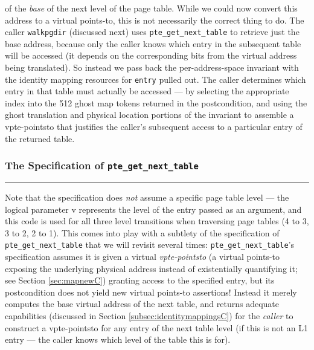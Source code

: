 of the \emph{base} of the next level of the page table.
While we could now convert this address to a virtual points-to, this is not necessarily the correct thing to do.
The caller \lstinline|walkpgdir| (discussed next) uses \lstinline|pte_get_next_table| to retrieve just the base address,
because only the caller knows which entry in the subsequent table will be accessed (it depends on the corresponding bits from the virtual
address being translated). So instead we pass back the per-address-space invariant with the identity mapping resources for \lstinline|entry|
pulled out. The caller determines which entry in that table must actually
be accessed --- by selecting the appropriate index into the 512 ghost map tokens returned in the postcondition,
and using the ghost translation and physical location portions of the invariant to assemble a vpte-pointsto
that justifies the caller's subsequent access to a particular entry of the returned table.

\subsubsection{The Specification of \lstinline|pte_get_next_table|}
\hrule

Note that the specification does \emph{not} assume a specific page table level --- the logical parameter \textsf{v} represents the level
of the entry passed as an argument, and this code
is used for all three level transitions when traversing page tables (4 to 3, 3 to 2, 2 to 1).
This comes into play with a subtlety of the specification of \lstinline|pte_get_next_table| that we will
revisit several times: \lstinline|pte_get_next_table|'s specification
assumes it is given a virtual \emph{vpte-pointsto}
(a virtual points-to exposing the underlying physical address instead of existentially quantifying it;
 see Section \ref{sec:mapnewC}) granting access to the specified entry,
but its postcondition does not yield new virtual points-to assertions!
Instead it merely computes the base virtual address of the next table, and returns adequate capabilities (discussed in Section \ref{subsec:identitymappingsC})
for the \emph{caller} to construct a vpte-pointsto for any entry of the next table level (if this is not an L1 entry ---
the caller knows which level of the table this is for).


